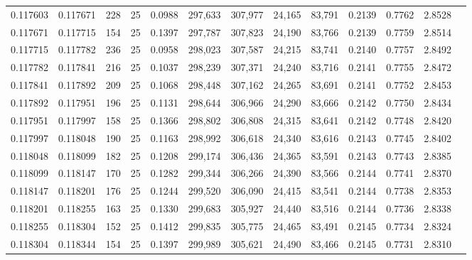 \begin{tabular}{rrrrrrrrrrrrr}
0.117603 & 0.117671 &   228 &  25 &                                     0.0988 & 297,633 & 307,977 &  24,165 &  83,791 & 0.2139 & 0.7762 & 2.8528 \\
0.117671 & 0.117715 &   154 &  25 &                                     0.1397 & 297,787 & 307,823 &  24,190 &  83,766 & 0.2139 & 0.7759 & 2.8514 \\
0.117715 & 0.117782 &   236 &  25 &                                     0.0958 & 298,023 & 307,587 &  24,215 &  83,741 & 0.2140 & 0.7757 & 2.8492 \\
0.117782 & 0.117841 &   216 &  25 &                                     0.1037 & 298,239 & 307,371 &  24,240 &  83,716 & 0.2141 & 0.7755 & 2.8472 \\
0.117841 & 0.117892 &   209 &  25 &                                     0.1068 & 298,448 & 307,162 &  24,265 &  83,691 & 0.2141 & 0.7752 & 2.8453 \\
0.117892 & 0.117951 &   196 &  25 &                                     0.1131 & 298,644 & 306,966 &  24,290 &  83,666 & 0.2142 & 0.7750 & 2.8434 \\
0.117951 & 0.117997 &   158 &  25 &                                     0.1366 & 298,802 & 306,808 &  24,315 &  83,641 & 0.2142 & 0.7748 & 2.8420 \\
0.117997 & 0.118048 &   190 &  25 &                                     0.1163 & 298,992 & 306,618 &  24,340 &  83,616 & 0.2143 & 0.7745 & 2.8402 \\
0.118048 & 0.118099 &   182 &  25 &                                     0.1208 & 299,174 & 306,436 &  24,365 &  83,591 & 0.2143 & 0.7743 & 2.8385 \\
0.118099 & 0.118147 &   170 &  25 &                                     0.1282 & 299,344 & 306,266 &  24,390 &  83,566 & 0.2144 & 0.7741 & 2.8370 \\
0.118147 & 0.118201 &   176 &  25 &                                     0.1244 & 299,520 & 306,090 &  24,415 &  83,541 & 0.2144 & 0.7738 & 2.8353 \\
0.118201 & 0.118255 &   163 &  25 &                                     0.1330 & 299,683 & 305,927 &  24,440 &  83,516 & 0.2144 & 0.7736 & 2.8338 \\
0.118255 & 0.118304 &   152 &  25 &                                     0.1412 & 299,835 & 305,775 &  24,465 &  83,491 & 0.2145 & 0.7734 & 2.8324 \\
0.118304 & 0.118344 &   154 &  25 &                                     0.1397 & 299,989 & 305,621 &  24,490 &  83,466 & 0.2145 & 0.7731 & 2.8310 \\

\end{tabular}

